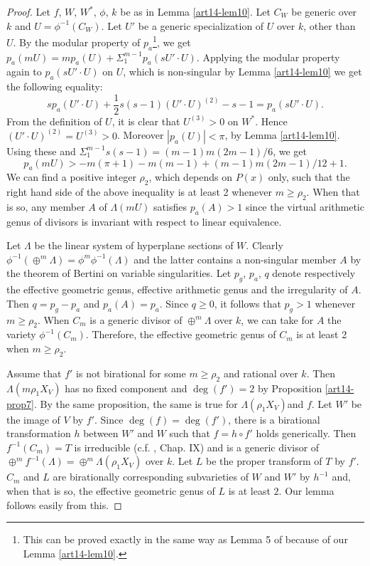 \begin{proof}
Let $f$, $W$, $W^{*}$, $\phi$, $k$ be as in Lemma \ref{art14-lem10}. Let $C_{W}$ be generic over $k$ and $U=\phi^{-1}(C_{W})$. Let $U'$ be a generic specialization of $U$ over $k$, other than $U$. By the modular property of $p_{a}$\footnote{This can be proved exactly in the same way as Lemma 5 of \cite{art14-key31} because of our Lemma \ref{art14-lem10}.}, we get $p_{a}(mU)=mp_{a}(U)+\Sigma^{m-1}_{1}p_{a}(sU'\cdot U)$. Applying the modular property again to $p_{a}(sU'\cdot U)$ on $U$, which is non-singular by Lemma \ref{art14-lem10} we get the following equality:
$$
sp_{a}(U'\cdot U)+\frac{1}{2}s(s-1)(U'\cdot U)^{(2)}-s-1=p_{a}(sU'\cdot U).
$$
From the definition of $U$, it is clear that $U^{(3)}>0$ on $W^{*}$. Hence $(U'\cdot U)^{(2)}=U^{(3)}>0$. Moreover $|p_{a}(U)|<\pi$, by Lemma \ref{art14-lem10}. Using these and $\Sigma^{m-1}_{1}s(s-1)=(m-1)m(2m-1)/6$, we get
$$
p_{a}(mU)>-m(\pi+1)-m(m-1)+(m-1)m(2m-1)/12+1.
$$
We can find a positive integer $\rho_{2}$, which depends on $P(x)$ only, such that the right hand side of the above inequality is at least 2 whenever $m\geq \rho_{2}$. When that is so, any member $A$ of $\Lambda(mU)$ satisfies $p_{a}(A)>1$ since the virtual arithmetic genus of divisors is invariant with respect to linear equivalence.

Let $\Lambda$ be the linear system of hyperplane sections of $W$. Clearly $\phi^{-1}(\oplus^{m}\Lambda)=\phi^{m}\phi^{-1}(\Lambda)$ and the latter contains a non-singular member $A$ by the theorem of Bertini on variable singularities. Let $p_{g}$, $p_{a}$, $q$ denote respectively the effective geometric genus, effective arithmetic genus and the irregularity of $A$. Then $q=p_{g}-p_{a}$ and $p_{a}(A)=p_{a}$. Since $q\geq 0$, it follows that $p_{g}>1$ whenever $m\geq \rho_{2}$. When $C_{m}$ is a generic divisor of $\oplus^{m}\Lambda$ over $k$, we can take for $A$ the variety $\phi^{-1}(C_{m})$. Therefore, the effective geometric genus of $C_{m}$ is at least 2 when $m\geq \rho_{2}$.

Assume that $f'$ is not birational for some $m\geq \rho_{2}$ and rational over $k$. Then $\Lambda(m\rho_{1}X_{V})$ has no fixed component and $\deg(f')=2$ by Proposition \ref{art14-prop7}. By the same proposition, the same is true for $\Lambda(\rho_{1}X_{V})$\pageoriginale and $f$. Let $W'$ be the image of $V$ by $f'$. Since $\deg(f)=\deg(f')$, there is a birational transformation $h$ between $W'$ and $W$ such that $f=h\circ f'$ holds generically. Then $f^{-1}(C_{m})=T$ is irreducible (c.f. \cite{art14-key25}, Chap. IX) and is a generic divisor of $\oplus^{m}f^{-1}(\Lambda)=\oplus^{m}\Lambda(\rho_{1}X_{V})$ over $k$. Let $L$ be the proper transform of $T$ by $f'$. $C_{m}$ and $L$ are birationally corresponding subvarieties of $W$ and $W'$ by $h^{-1}$ and, when that is so, the effective geometric genus of $L$ is at least $2$. Our lemma follows easily from this.


\end{proof}
